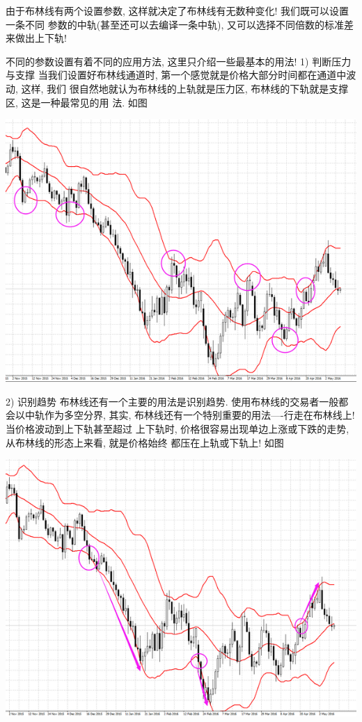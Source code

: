 由于布林线有两个设置参数, 这样就决定了布林线有无数种变化! 我们既可以设置一条不同
参数的中轨(甚至还可以去编译一条中轨), 又可以选择不同倍数的标准差来做出上下轨!

不同的参数设置有着不同的应用方法, 这里只介绍一些最基本的用法!
1) 判断压力与支撑
当我们设置好布林线通道时, 第一个感觉就是价格大部分时间都在通道中波动, 这样, 我们
很自然地就认为布林线的上轨就是压力区, 布林线的下轨就是支撑区, 这是一种最常见的用
法. 如图

\includegraphics[width=\textwidth]{figure/boll2.png}

2) 识别趋势
布林线还有一个主要的用法是识别趋势. 使用布林线的交易者一般都会以中轨作为多空分界,
其实, 布林线还有一个特别重要的用法----行走在布林线上! 当价格波动到上下轨甚至超过
上下轨时, 价格很容易出现单边上涨或下跌的走势, 从布林线的形态上来看, 就是价格始终
都压在上轨或下轨上! 如图

\includegraphics[width=\textwidth]{figure/boll3.png}

